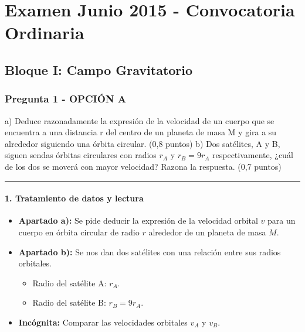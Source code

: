 \chapter{Examen Junio 2015 - Convocatoria Ordinaria}
\label{chap:2015_jun_ord}

\section{Bloque I: Campo Gravitatorio}
\label{sec:grav_2015_jun_ord}

\subsection{Pregunta 1 - OPCIÓN A}
\label{subsec:1A_2015_jun_ord}

\begin{cajaenunciado}
a) Deduce razonadamente la expresión de la velocidad de un cuerpo que se encuentra a una distancia r del centro de un planeta de masa M y gira a su alrededor siguiendo una órbita circular. (0,8 puntos)
b) Dos satélites, A y B, siguen sendas órbitas circulares con radios $r_A$ y $r_B=9r_A$ respectivamente, ¿cuál de los dos se moverá con mayor velocidad? Razona la respuesta. (0,7 puntos)
\end{cajaenunciado}
\hrule

\subsubsection*{1. Tratamiento de datos y lectura}
\begin{itemize}
    \item \textbf{Apartado a):} Se pide deducir la expresión de la velocidad orbital $v$ para un cuerpo en órbita circular de radio $r$ alrededor de un planeta de masa $M$.
    \item \textbf{Apartado b):} Se nos dan dos satélites con una relación entre sus radios orbitales.
    \begin{itemize}
        \item Radio del satélite A: $r_A$.
        \item Radio del satélite B: $r_B = 9r_A$.
    \end{itemize}
    \item \textbf{Incógnita:} Comparar las velocidades orbitales $v_A$ y $v_B$.
\end{itemize}

